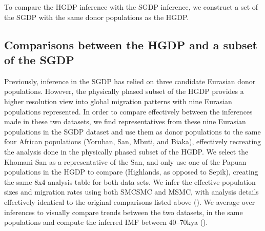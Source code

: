 To compare the HGDP inference with the SGDP inference, we construct a set of the SGDP with the same donor populations as the HGDP.






\subsection{Comparisons between the HGDP and a subset of the SGDP}

Previously, inference in the SGDP has relied on three candidate Eurasian donor populations. However, the physically phased subset of the HGDP provides a higher resolution view into global migration patterns with nine Eurasian populations represented. In order to compare effectively between the inferences made in these two datasets, we find representatives from these nine Eurasian populations in the SGDP dataset and use them as donor populations to the same four African populations (Yoruban, San, Mbuti, and Biaka), effectively recreating the analysis done in the physically phased subset of the HGDP. We select the Khomani San as a representative of the San, and only use one of the Papuan populations in the HGDP to compare (Highlands, as opposed to Sepik), creating the same 8x4 analysis table for both data sets. We infer the effective population sizes and migration rates using both SMCSMC and MSMC, with analysis details effectively identical to the original comparisons listed above (). We average over inferences to visually compare trends between the two datasets, in the same populations and compute the inferred IMF between 40--70kya ().  

